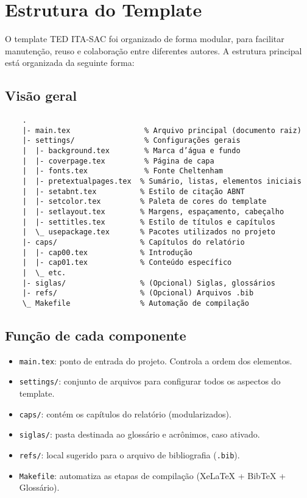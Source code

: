 \chapter{Estrutura do Template}

O template TED ITA-SAC foi organizado de forma modular, para facilitar manutenção, reuso e colaboração entre diferentes autores. A estrutura principal está organizada da seguinte forma:

\section{Visão geral}

\begin{verbatim}
	.
	|- main.tex                 % Arquivo principal (documento raiz)
	|- settings/                % Configurações gerais
	|  |- background.tex        % Marca d’água e fundo
	|  |- coverpage.tex         % Página de capa
	|  |- fonts.tex             % Fonte Cheltenham
	|  |- pretextualpages.tex  % Sumário, listas, elementos iniciais
	|  |- setabnt.tex          % Estilo de citação ABNT
	|  |- setcolor.tex         % Paleta de cores do template
	|  |- setlayout.tex        % Margens, espaçamento, cabeçalho
	|  |- settitles.tex        % Estilo de títulos e capítulos
	|  \_ usepackage.tex       % Pacotes utilizados no projeto
	|- caps/                   % Capítulos do relatório
	|  |- cap00.tex            % Introdução
	|  |- cap01.tex            % Conteúdo específico
	|  \_ etc.
	|- siglas/                 % (Opcional) Siglas, glossários
	|- refs/                   % (Opcional) Arquivos .bib
	\_ Makefile                % Automação de compilação
\end{verbatim}


\section{Função de cada componente}

\begin{itemize}
    \item \texttt{main.tex}: ponto de entrada do projeto. Controla a ordem dos elementos.
    \item \texttt{settings/}: conjunto de arquivos para configurar todos os aspectos do template.
    \item \texttt{caps/}: contém os capítulos do relatório (modularizados).
    \item \texttt{siglas/}: pasta destinada ao glossário e acrônimos, caso ativado.
    \item \texttt{refs/}: local sugerido para o arquivo de bibliografia (\texttt{.bib}).
    \item \texttt{Makefile}: automatiza as etapas de compilação (XeLaTeX + BibTeX + Glossário).
\end{itemize}

